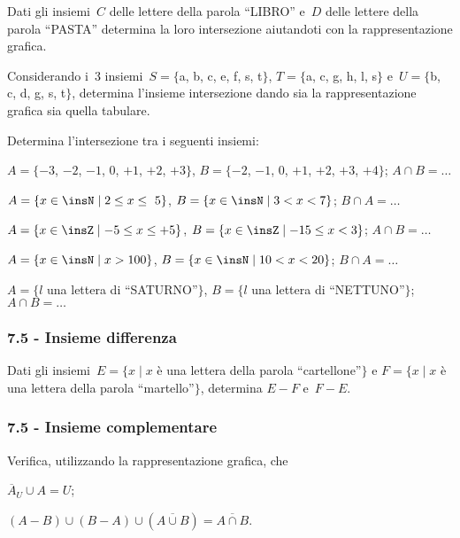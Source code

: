 \begin{esercizio}
 \label{ese:7.11}
Dati gli insiemi~$C$ delle lettere della parola ``LIBRO'' e~$D$ delle lettere della
parola ``PASTA'' determina la loro intersezione aiutandoti con la rappresentazione grafica.
\end{esercizio}

\begin{esercizio}
 \label{ese:7.12}
Considerando i~3 insiemi~$S=\{$a, b, c, e, f, s, t$\}$, $T=\{$a, c, g, h, l, s$\}$ e~$U=\{$b, c, d, g, s, t$\}$,
determina l'insieme intersezione dando sia la rappresentazione grafica sia quella tabulare.
 \end{esercizio}

\begin{esercizio}
 \label{ese:7.13}
 Determina l'intersezione tra i seguenti insiemi:
\begin{enumeratea}
 \item $A=\{-3$, $-2$, $-1$, $0$, $+1$, $+2$, $+3\}$, $B=\{-2$, $-1$, $0$, $+1$, $+2$, $+3$, $+4\}$; $A\cap B=\ldots$
 \item $A=\{x\in\insN\mid 2\le x\le~5\}$, $B=\{x\in\insN\mid 3<x<7\}$; $B\cap A=\ldots$
 \item $A=\{x\in\insZ\mid -5\le x\le+5\}$, $B=\{x\in\insZ\mid -15\le x<3\}$; $A\cap B=\ldots$
 \item $A=\{x\in\insN\mid x>100\}$, $B=\{x\in\insN\mid 10<x<20\}$; $B\cap A=\ldots$
 \item $A=\{l$ una lettera di ``SATURNO''$\}$, $B=\{l$ una lettera di ``NETTUNO''$\}$; $A\cap B=\ldots$
\end{enumeratea}
\end{esercizio}

\subsubsection*{7.5 - Insieme differenza}
\begin{esercizio}
\label{ese:7.14}
Dati gli insiemi~$E=\{x\mid x$ è una lettera della parola ``cartellone''$\}$ e
$F=\{x\mid x$ è una lettera della parola ``martello''$\}$, determina
$E-F$ e~$F-E$.
\end{esercizio}

\subsubsection*{7.5 - Insieme complementare}
\begin{esercizio}
\label{ese:7.15}
Verifica, utilizzando la rappresentazione grafica, che
\begin{multicols}{2}
 \begin{enumeratea}
 \item $\overline{A}_{U}\cup A=U$;
 \item $(A-B)\cup (B-A)\cup (\overline{A\cup B})=\overline{A\cap B}$.
 \end{enumeratea}
\end{multicols}
\end{esercizio}

